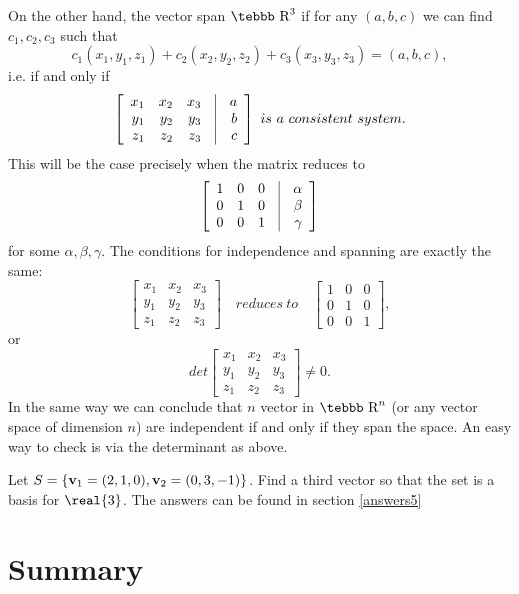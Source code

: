 On the other hand, the vector span $\mbox {\tebbb R}^3$ if for any
$(a,b,c)$ we can find $c_1,c_2,c_3$ such that
$$c_1(x_1,y_1,z_1)+c_2(x_2,y_2,z_2)+c_3(x_3,y_3,z_3)=(a,b,c),$$
i.e. if and only if
$$ \left[ \begin{array}{rrrcr} x_1 & x_2 & x_3 & \vline & a
\\ y_1 & y_2 & y_3 & \vline & b \\ z_1 & z_2 & z_3 & \vline & c
\end{array}  \right]~is~a~consistent~system.$$
This will be the case precisely when the matrix reduces to
$$ \left[ \begin{array}{rrrcr} 1 & 0 & 0 & \vline & \alpha
\\ 0 & 1 & 0 & \vline & \beta \\ 0 & 0 & 1 & \vline & \gamma
\end{array}  \right]$$
for some $\alpha,\beta,\gamma$. The conditions for independence
and spanning are exactly the same:
$$ \left[ \begin{array}{rrr} x_1 & x_2 & x_3 \\
y_1 & y_2 & y_3 \\ z_1 & z_2 & z_3 \end{array}  \right] \quad
reduces~to \quad \left [ \begin{array}{rrr} 1 & 0 & 0 \\ 0 & 1 & 0
\\ 0 & 0 & 1 \end{array} \right ], $$
or
$$det\left[ \begin{array}{rrr} x_1 & x_2 & x_3 \\
y_1 & y_2 & y_3 \\ z_1 & z_2 & z_3 \end{array}  \right]\neq 0.$$
In the same way we can conclude that $n$ vector in $\mbox {\tebbb
R}^n$ (or any vector space of dimension $n$) are independent if and only if
they span the space. An easy way to check is via the determinant
as above.

 Let $S=\{{\bf
v}_1=(2,1,0), {\bf v}_2=(0,3,-1)\}$. Find a third vector so that
the set is a basis for $\real{3}$. The answers can be found in
section \ref{answers5}

\section{Summary} \label{ssec.sum5}

